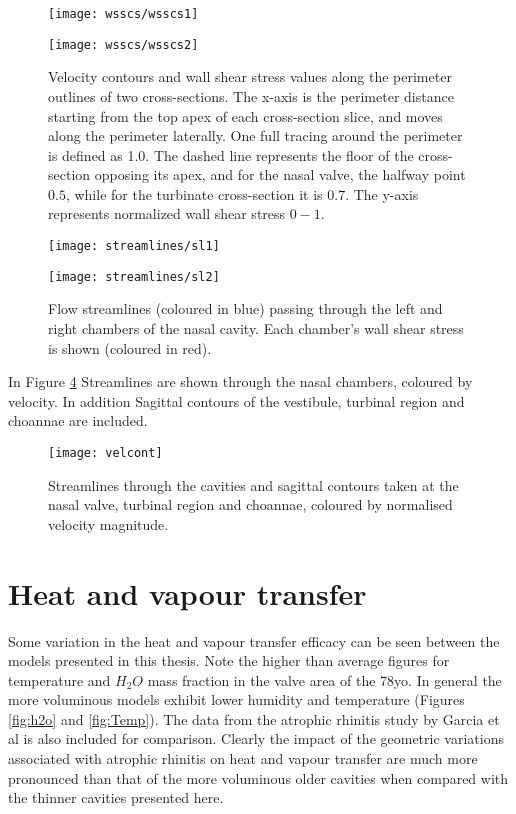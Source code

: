 \begin{figure} 
  \texttt{[image: wsscs/wsscs1]}
  \label{fig:wcs}
\end{figure}

\begin{figure} 
  \texttt{[image: wsscs/wsscs2]}
  \caption{Velocity contours and wall shear stress values along the perimeter outlines of two cross-sections. The x-axis is the perimeter distance starting from the top apex of each cross-section slice, and moves along the perimeter laterally. One full tracing around the perimeter is defined as 1.0. The dashed line represents the floor of the cross-section opposing its apex, and for the nasal valve, the halfway point \(0.5\), while for the turbinate cross-section it is 0.7. The y-axis represents normalized wall shear stress \(0 - 1\).}
  \label{fig:wcs}
\end{figure}

\begin{figure} 
  \texttt{[image: streamlines/sl1]}
  \end{figure}

\begin{figure} 
  \texttt{[image: streamlines/sl2]}
  \caption{Flow streamlines (coloured in blue) passing through the left and right chambers of the nasal cavity. Each chamber’s wall shear stress is shown (coloured in red).}
  \label{fig:vsl}
\end{figure}

In Figure \ref{fig:velcont} Streamlines are shown through the nasal chambers, coloured by velocity. In addition Sagittal contours of the vestibule, turbinal region and choannae are included.
\begin{figure} 
  \texttt{[image: velcont]}
  \caption{Streamlines through the cavities and sagittal contours taken at the nasal valve, turbinal region and choannae, coloured by normalised velocity magnitude.}
  \label{fig:velcont}
\end{figure}

\section{Heat and vapour transfer}

Some variation in the heat and vapour transfer efficacy can be seen between the models presented in this thesis. Note the higher than average figures for temperature and $H_2 O$ mass fraction in the valve area of the 78yo. In general the more voluminous models exhibit lower humidity and temperature (Figures \ref{fig:h2o} and \ref{fig:Temp}). The data from the atrophic rhinitis study by Garcia et al \cite{Garcia2007} is also included for comparison. Clearly the impact of the geometric variations associated with atrophic rhinitis on heat and vapour transfer are much more pronounced than that of the more voluminous older cavities when compared with the thinner cavities presented here. 


